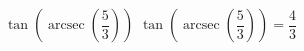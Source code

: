  {$\tan\left(\operatorname{arcsec}\left(\dfrac{5}{3}\right)\right)$ }
{ $\tan\left(\operatorname{arcsec}\left(\dfrac{5}{3}\right)\right) = \dfrac{4}{3}$}
